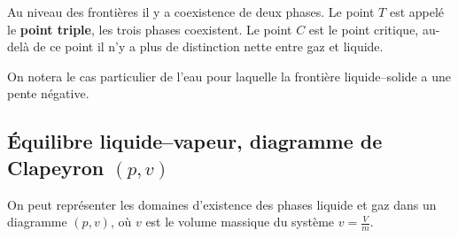 \documentclass{cours}
\begin{document}
Au niveau des frontières il y a coexistence de deux phases. Le point $T$ est appelé le \textbf{point triple}, les trois phases coexistent. Le point $C$ est le point critique, au-delà de ce point il n'y a plus de distinction nette entre gaz et liquide.

On notera le cas particulier de l'eau pour laquelle la frontière liquide--solide a une pente négative.

\subsection{Équilibre liquide--vapeur, diagramme de Clapeyron $(p, v)$}%
\label{sub:equilibre_liquide_vapeur_diagramme_de_clapeyron_p_v_}
 
On peut représenter les domaines d'existence des phases liquide et gaz dans un diagramme $(p,v)$, où $v$ est le volume massique du système $v=\frac{V}{m}$.  
\end{document}

